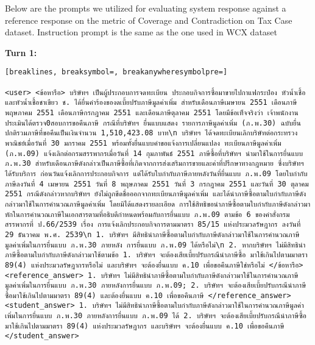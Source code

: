 Below are the prompts we utilized for evaluating system response against a reference response on the metric of Coverage and Contradiction on Tax Case dataset. Instruction prompt is the same as the one used in WCX dataset


\textbf{Turn 1: }
\begin{Verbatim}[breaklines, breaksymbol=, breakanywheresymbolpre=]

<user> <ข้อหารือ> บริษัทฯ เป็นผู้ประกอบการจดทะเบียน ประกอบกิจการซื้อมาขายไปกาแฟกระป๋อง หัวน้ำเชื้อ และหัวน้ำเชื้อชาเขียว ช. ได้ยื่นคำร้องของดเบี้ยปรับภาษีมูลค่าเพิ่ม สำหรับเดือนภาษีเมษายน 2551 เดือนภาษีพฤษภาคม 2551 เดือนภาษีกรกฎาคม 2551 และเดือนภาษีตุลาคม 2551 โดยมีข้อเท็จจริงว่า เจ้าพนักงานประเมินได้ตรวจ0สอบการขอคืนภาษี กรณีที่บริษัทฯ ยื่นแบบแสดง รายการภาษีมูลค่าเพิ่ม (ภ.พ.30) ฉบับยื่นปกติรวมภาษีที่ขอคืนเป็นเงินจำนวน 1,510,423.08 บาท\n บริษัทฯ ได้จดทะเบียนเลิกบริษัทต่อกระทรวงพาณิชย์เมื่อวันที่ 30 มกราคม 2551 พร้อมทั้งยื่นแบบคำขอแจ้งการเปลี่ยนแปลง ทะเบียนภาษีมูลค่าเพิ่ม (ภ.พ.09) แจ้งเลิกต่อกรมสรรพากรเมื่อวันที่ 14 กุมภาพันธ์ 2551 ภาษีซื้อที่บริษัทฯ นำมาใช้ในการยื่นแบบ ภ.พ.30 สำหรับเดือนภาษีดังกล่าวเป็นภาษีซื้อที่เกิดจากการส่งเสริมการขายและค่าที่ปรึกษาทางกฎหมาย ซึ่งบริษัทฯ ได้รับบริการ ก่อนวันแจ้งเลิกการประกอบกิจการ แต่ได้รับใบกำกับภาษีภายหลังวันที่ยื่นแบบ ภ.พ.09 โดยใบกำกับภาษีลงวันที่ 4 เมษายน 2551 วันที่ 8 พฤษภาคม 2551 วันที่ 3 กรกฎาคม 2551 และวันที่ 30 ตุลาคม 2551 กรณีดังกล่าวหากบริษัทฯ ยังไม่ถูกขีดชื่อออกจากทะเบียนภาษีมูลค่าเพิ่ม และได้นำภาษีซื้อตามใบกำกับภาษีดังกล่าวมาใช้ในการคำนวณภาษีมูลค่าเพิ่ม โดยมิได้แสดงรายละเอียด การใช้สิทธิขอนำภาษีซื้อตามใบกำกับภาษีดังกล่าวมาหักในการคำนวณภาษีในเอกสารตามที่อธิบดีกำหนดพร้อมกับการยื่นแบบ ภ.พ.09 ตามข้อ 6 ของคำสั่งกรมสรรพากรที่ ป.66/2539 เรื่อง การแจ้งเลิกประกอบกิจการตามมาตรา 85/15 แห่งประมวลรัษฎากร ลงวันที่ 29 ธันวาคม พ.ศ. 2539\n 1. บริษัทฯ มีสิทธินำภาษีซื้อตามใบกำกับภาษีดังกล่าวมาใช้ในการคำนวณภาษีมูลค่าเพิ่มในการยื่นแบบ ภ.พ.30 ภายหลัง การยื่นแบบ ภ.พ.09 ได้หรือไม่\n 2. หากบริษัทฯ ไม่มีสิทธินำภาษีซื้อตามใบกำกับภาษีดังกล่าวมาใช้ตามข้อ 1. บริษัทฯ จะต้องเสียเบี้ยปรับกรณีนำภาษีซื้อ มาใช้เกินไปตามมาตรา 89(4) แห่งประมวลรัษฎากรหรือไม่ และบริษัทฯ จะต้องยื่นแบบ ค.10 เพื่อขอคืนภาษีใช่หรือไม่ </ข้อหารือ>
<reference_answer> 1. บริษัทฯ ไม่มีสิทธินำภาษีซื้อตามใบกำกับภาษีดังกล่าวมาใช้ในการคำนวณภาษีมูลค่าเพิ่มในการยื่นแบบ ภ.พ.30 ภายหลังการยื่นแบบ ภ.พ.09; 2. บริษัทฯ จะต้องเสียเบี้ยปรับกรณีนำภาษีซื้อมาใช้เกินไปตามมาตรา 89(4) และต้องยื่นแบบ ค.10 เพื่อขอคืนภาษี </reference_answer>
<student_answer> 1. บริษัทฯ ไม่มีสิทธินำภาษีซื้อตามใบกำกับภาษีดังกล่าวมาใช้ในการคำนวณภาษีมูลค่าเพิ่มในการยื่นแบบ ภ.พ.30 ภายหลังการยื่นแบบ ภ.พ.09 ได้ 2. บริษัทฯ จะต้องเสียเบี้ยปรับกรณีนำภาษีซื้อมาใช้เกินไปตามมาตรา 89(4) แห่งประมวลรัษฎากร และบริษัทฯ จะต้องยื่นแบบ ค.10 เพื่อขอคืนภาษี </student_answer>


\end{Verbatim}
